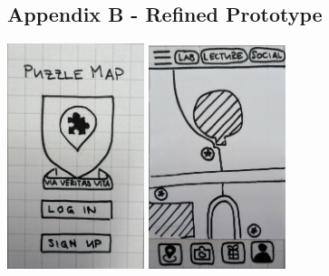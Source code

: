 \documentclass[10pt,twocolumn]{article} %
\begin{document}
\subsection*{Appendix B - Refined Prototype}
\includegraphics[width=0.3\textwidth]{./figures/refined_proto/1.jpg}
\includegraphics[width=0.3\textwidth]{./figures/refined_proto/2.jpg}

\newpage
\end{document}
